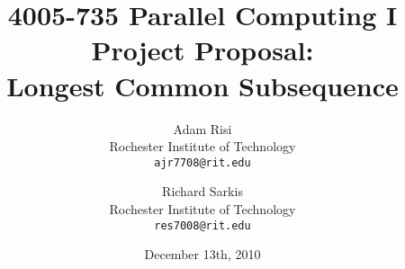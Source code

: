 \documentclass[12pt]{report}
\title{4005-735 Parallel Computing I \\ Project Proposal: \\  Longest Common Subsequence}
\author{Adam Risi \\ Rochester Institute of Technology \\ \texttt{ajr7708@rit.edu} \and Richard Sarkis \\ Rochester Institute of Technology \\  \texttt{res7008@rit.edu}}
\date{December 13th, 2010}
\begin{document}
\maketitle







%
%
\nocite{BenMabrouk:2010p429,Liu:2006p436}
\nocite{JinxianLin:2010p424,Rashid:2007p409}




\end{document}
